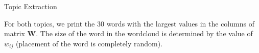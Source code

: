 \documentclass[11pt,compress,t,notes=noshow, xcolor=table]{beamer}
\begin{document}
\begin{vbframe}{Topic Extraction}

For both topics, we print the $30$ words with the largest values in the columns of matrix $\mathbf{W}$. The size of the word in the wordcloud is determined by the value of $w_{ij}$ (placement of the word is completely random).\\

\begin{figure}
	\\
  \end{figure}


\end{vbframe}

\end{document}
